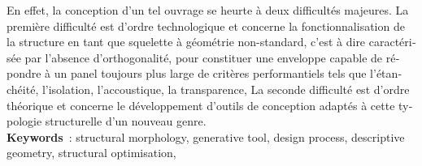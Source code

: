 \begin{otherlanguage}{french}
En effet, la conception d'un tel ouvrage se heurte à deux difficultés majeures. La première difficulté est d'ordre technologique et concerne la fonctionnalisation de la structure en tant que squelette à géométrie non-standard, c'est à dire caractérisée par l'absence d'orthogonalité, pour constituer une enveloppe capable de répondre à un panel toujours plus large de critères performantiels tels que l'étanchéité, l'isolation, l'accoustique, la transparence, \telp{} La seconde difficulté est d'ordre théorique et concerne le développement d'outils de conception adaptés à cette typologie structurelle d'un nouveau genre.
%
%
%
%
%
%
%
%
%
%
%
%
%
\vspace{12pt}\\
\textbf{Keywords}~: structural morphology, generative tool, design process, descriptive geometry, structural optimisation,
\end{otherlanguage}
